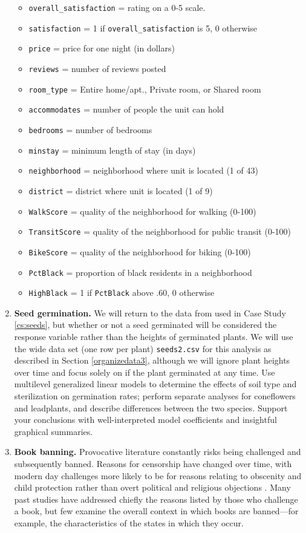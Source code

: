 \documentclass[
]{krantz}
\providecommand{\tightlist}{%
  \setlength{\itemsep}{0pt}\setlength{\parskip}{0pt}}
\begin{document}
\begin{enumerate}
  \begin{itemize}
  \tightlist
  \item
    \texttt{overall\_satisfaction} = rating on a 0-5 scale.
  \item
    \texttt{satisfaction} = 1 if \texttt{overall\_satisfaction} is 5, 0 otherwise
  \item
    \texttt{price} = price for one night (in dollars)
  \item
    \texttt{reviews} = number of reviews posted
  \item
    \texttt{room\_type} = Entire home/apt., Private room, or Shared room
  \item
    \texttt{accommodates} = number of people the unit can hold
  \item
    \texttt{bedrooms} = number of bedrooms
  \item
    \texttt{minstay} = minimum length of stay (in days)
  \item
    \texttt{neighborhood} = neighborhood where unit is located (1 of 43)
  \item
    \texttt{district} = district where unit is located (1 of 9)
  \item
    \texttt{WalkScore} = quality of the neighborhood for walking (0-100)
  \item
    \texttt{TransitScore} = quality of the neighborhood for public transit (0-100)
  \item
    \texttt{BikeScore} = quality of the neighborhood for biking (0-100)
  \item
    \texttt{PctBlack} = proportion of black residents in a neighborhood
  \item
    \texttt{HighBlack} = 1 if \texttt{PctBlack} above .60, 0 otherwise
  \end{itemize}
\item
  \textbf{Seed germination.} We will return to the data from \citet{Angell2010} used in Case Study \ref{cs:seeds}, but whether or not a seed germinated will be considered the response variable rather than the heights of germinated plants. We will use the wide data set (one row per plant) \texttt{seeds2.csv} for this analysis as described in Section \ref{organizedata3}, although we will ignore plant heights over time and focus solely on if the plant germinated at any time. Use multilevel generalized linear models to determine the effects of soil type and sterilization on germination rates; perform separate analyses for coneflowers and leadplants, and describe differences between the two species. Support your conclusions with well-interpreted model coefficients and insightful graphical summaries.
\item
  \textbf{Book banning.} Provocative literature constantly risks being challenged and subsequently banned. Reasons for censorship have changed over time, with modern day challenges more likely to be for reasons relating to obscenity and child protection rather than overt political and religious objections \citep{Jenkins2006}. Many past studies have addressed chiefly the reasons listed by those who challenge a book, but few examine the overall context in which books are banned---for example, the characteristics of the states in which they occur.


\end{enumerate}
\end{document}
